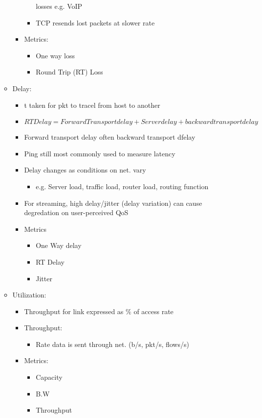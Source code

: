 \documentclass[a4paper]{article}
\begin{document}
\begin{itemize}
\begin{itemize}
\begin{itemize}
\begin{itemize}
					losses e.g. VoIP
				\item TCP resends lost packets at slower rate
			\end{itemize}
			\item Metrics:
			\begin{itemize}
				\item One way loss
				\item Round Trip (RT) Loss
			\end{itemize}
		\end{itemize}
		\item Delay:
		\begin{itemize}
			\item t taken for pkt to tracel from host to another
			\item $RT Delay = Forward Transport delay + Server delay
				+ backward transport delay$ 
			\item Forward transport delay often \neq backward
				transport dfelay
			\item Ping still most commonly used to measure latency
			\item Delay changes as conditions on net. vary
			\begin{itemize}
				\item e.g. Server load, traffic load, router
					load, routing function
			\end{itemize}
			\item For streaming, high delay/jitter (delay variation)
				can cause degredation on user-perceived QoS
			\item Metrics
			\begin{itemize}
				\item One Way delay
				\item RT Delay
				\item Jitter
			\end{itemize}
		\end{itemize}
		\item Utilization:
		\begin{itemize}
			\item Throughput for link expressed as $\%$ of access
				rate
			\item Throughput:
			\begin{itemize}
				\item Rate data is sent through net. (b/s,
					pkt/s, flows/s)
			\end{itemize}
			\item Metrics:
			\begin{itemize}
				\item Capacity
				\item B.W
				\item Throughput
			\end{itemize}
		\end{itemize}
	\end{itemize}
\end{itemize}
\end{document}
